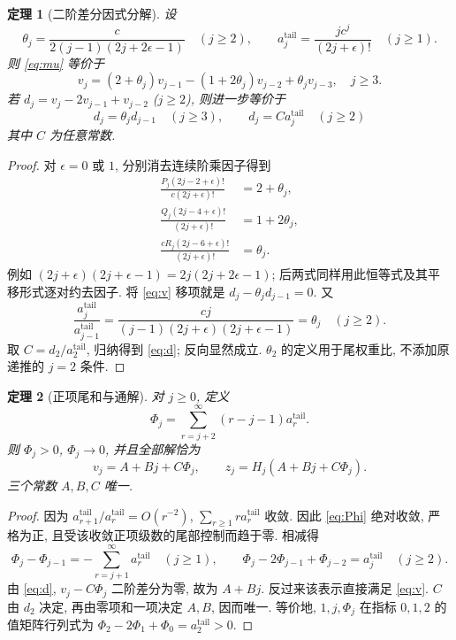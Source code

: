 \documentclass[UTF8]{ctexart}
\newtheorem{theorem}{定理}[section]
\newcommand{\eps}{\epsilon}
\begin{document}
\begin{theorem}[二阶差分因式分解]\label{thm:factor}
 设
\[
 \theta_j=\frac{c}{2(j-1)(2j+2\eps-1)}\quad(j\ge2),\qquad
 a_j^{\mathrm{tail}}=\frac{jc^j}{(2j+\eps)!}\quad(j\ge1).
\]
 则 \eqref{eq:mu} 等价于
\begin{equation}\label{eq:v}
 v_j=(2+\theta_j)v_{j-1}-(1+2\theta_j)v_{j-2}+\theta_jv_{j-3},\quad j\ge3.
\end{equation}
 若 $d_j=v_j-2v_{j-1}+v_{j-2}$ ($j\ge2$), 则进一步等价于
\begin{equation}\label{eq:d}
 d_j=\theta_jd_{j-1}\quad(j\ge3),\qquad
 d_j=C a_j^{\mathrm{tail}}\quad(j\ge2)
\end{equation}
 其中 $C$ 为任意常数.
\end{theorem}
\begin{proof}
 对 $\eps=0$ 或 $1$, 分别消去连续阶乘因子得到
\begin{align*}
 \frac{P_j(2j-2+\eps)!}{c(2j+\eps)!}&=2+\theta_j,\\
 \frac{Q_j(2j-4+\eps)!}{(2j+\eps)!}&=1+2\theta_j,\\
 \frac{cR_j(2j-6+\eps)!}{(2j+\eps)!}&=\theta_j.
\end{align*}
 例如 $(2j+\eps)(2j+\eps-1)=2j(2j+2\eps-1)$;
 后两式同样用此恒等式及其平移形式逐对约去因子.
 将 \eqref{eq:v} 移项就是 $d_j-\theta_jd_{j-1}=0$.
 又
\[
 \frac{a_j^{\mathrm{tail}}}{a_{j-1}^{\mathrm{tail}}}
 =\frac{cj}{(j-1)(2j+\eps)(2j+\eps-1)}=\theta_j\quad(j\ge2).
\]
 取 $C=d_2/a_2^{\mathrm{tail}}$, 归纳得到 \eqref{eq:d}; 反向显然成立.
 $\theta_2$ 的定义用于尾权重比, 不添加原递推的 $j=2$ 条件.
\end{proof}

\begin{theorem}[正项尾和与通解]\label{thm:general}
 对 $j\ge0$, 定义
\begin{equation}\label{eq:Phi}
 \Phi_j=\sum_{r=j+2}^{\infty}(r-j-1)a_r^{\mathrm{tail}}.
\end{equation}
 则 $\Phi_j>0$, $\Phi_j\to0$, 并且全部解恰为
\begin{equation}\label{eq:general}
 v_j=A+Bj+C\Phi_j,\qquad z_j=H_j(A+Bj+C\Phi_j).
\end{equation}
 三个常数 $A,B,C$ 唯一.
\end{theorem}
\begin{proof}
 因为 $a_{r+1}^{\mathrm{tail}}/a_r^{\mathrm{tail}}=O(r^{-2})$,
 $\sum_{r\ge1}r a_r^{\mathrm{tail}}$ 收敛.
 因此 \eqref{eq:Phi} 绝对收敛, 严格为正,
 且受该收敛正项级数的尾部控制而趋于零.
 相减得
\[
 \Phi_j-\Phi_{j-1}=-\sum_{r=j+1}^{\infty}a_r^{\mathrm{tail}}\quad(j\ge1),
 \qquad \Phi_j-2\Phi_{j-1}+\Phi_{j-2}=a_j^{\mathrm{tail}}\quad(j\ge2).
\]
 由 \eqref{eq:d}, $v_j-C\Phi_j$ 二阶差分为零, 故为 $A+Bj$.
 反过来该表示直接满足 \eqref{eq:v}.
 $C$ 由 $d_2$ 决定, 再由零项和一项决定 $A,B$, 因而唯一.
 等价地, $1,j,\Phi_j$ 在指标 $0,1,2$ 的值矩阵行列式为
 $\Phi_2-2\Phi_1+\Phi_0=a_2^{\mathrm{tail}}>0$.
\end{proof}
\end{document}
